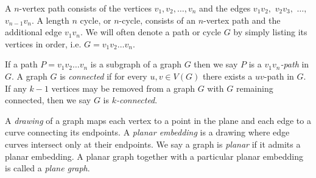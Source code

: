 \documentclass[letterpaper, 12pt]{article}
\theoremstyle{thm}
\begin{document}
A $n$-vertex path consists of the vertices $v_1,v_2,\ldots,v_n$ and the edges
$v_1v_2,$ $v_2v_3,$ $\ldots,$ $v_{n-1}v_n$. A length $n$ cycle, or $n$-cycle, consists of
an $n$-vertex path and the additional edge $v_1v_n$. We will often denote a path
or cycle $G$ by simply listing its vertices in order, i.e. $G=v_1v_2\ldots v_n$.

If a path $P=v_1v_2\ldots v_n$ is a subgraph of a graph $G$ then we say $P$ is a
\textit{$v_1v_n$-path} in $G$. A graph $G$ is \textit{connected} if for every
$u,v\in V(G)$ there exists a $uv$-path in $G$. If any $k-1$ vertices may be
removed from a graph $G$ with $G$ remaining connected, then we say $G$ is
\textit{$k$-connected}.

A \textit{drawing} of a graph maps each vertex to a point in the
plane and each edge to a curve connecting its endpoints. A \textit{planar
embedding} is a drawing where edge curves intersect only at their
endpoints. We say a graph is \textit{planar} if it admits a planar embedding. A
planar graph together with a particular planar embedding is called a
\textit{plane graph}.
\end{document}
